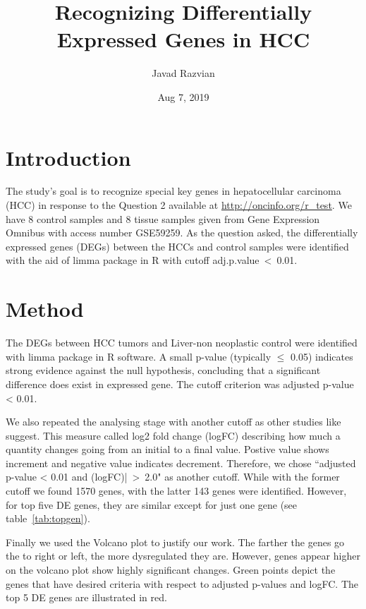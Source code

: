 \documentclass[12pt, ]{article}
\title{Recognizing Differentially Expressed Genes in HCC}
\author{Javad Razvian}
\date{Aug 7, 2019}
\begin{document}
\maketitle

\section{Introduction}
The study's goal is to recognize special key genes in hepatocellular carcinoma (HCC) in response to the Question 2 available at \url{http://oncinfo.org/r_test}.
We have 8 control samples and 8 tissue samples given from Gene Expression Omnibus with access number GSE59259.
As the question asked, the differentially expressed genes (DEGs) between the HCCs and control samples were identified with the aid of limma
package in R with cutoff  adj.p.value~<~0.01. 

\section{Method}

The DEGs between HCC tumors and Liver-non neoplastic control were identified with 
limma \cite{bib:limma} package in R software. 
A small p-value (typically $\leq$ 0.05) indicates strong evidence against the null hypothesis, concluding that a significant difference does exist in expressed gene. The cutoff criterion was adjusted p-value < 0.01. 

We also repeated the analysing stage with another cutoff as other studies like \cite{bib:skg} suggest. This measure called log2 fold change (logFC) describing how much a quantity changes going from an initial to a final value. Postive value shows increment and negative value indicates decrement.
Therefore, we chose ``adjusted p-value < 0.01 and (logFC)|~>~2.0" as another cutoff.
While with the former cutoff we found 1570 genes, with the latter 143 genes were identified. However, for top five DE genes, they are similar except for just 
one gene (see table~\ref{tab:topgen}).

Finally we used the Volcano plot to justify our work. The farther the genes go the to right or left, the more dysregulated they are. However, genes appear higher on the volcano plot show highly significant changes. Green points depict the genes that have desired criteria with respect to 
adjusted p-values and logFC. 
The top 5 DE genes are illustrated in red. 
\end{document}
